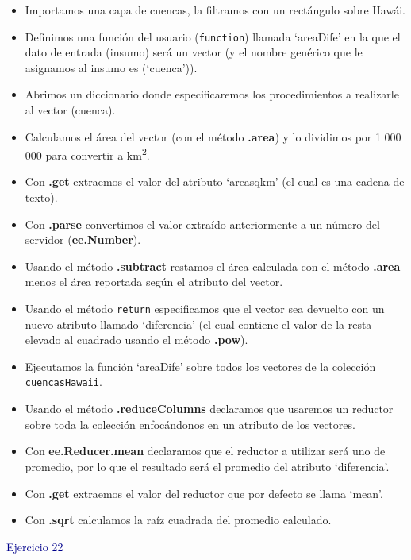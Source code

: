 \documentclass[
  12pt,
  letterpaper,
  twoside]{book}
\providecommand{\tightlist}{%
  \setlength{\itemsep}{0pt}\setlength{\parskip}{0pt}}
\newcommand\boldpurple[1]{\textcolor{darkpurple}{\textbf{#1}}}
\begin{document}
\begin{itemize}
\tightlist
\item
  Importamos una capa de cuencas, la filtramos con un rectángulo sobre Hawái.
\item
  Definimos una función del usuario (\texttt{function}) llamada `areaDife' en la que el dato de entrada (insumo) será un vector (y el nombre genérico que le asignamos al insumo es (`cuenca')).
\item
  Abrimos un diccionario donde especificaremos los procedimientos a realizarle al vector (cuenca).
\item
  Calculamos el área del vector (con el método \boldpurple{.area}) y lo dividimos por 1 000 000 para convertir a km\textsuperscript{2}.
\item
  Con \boldpurple{.get} extraemos el valor del atributo `areasqkm' (el cual es una cadena de texto).
\item
  Con \boldpurple{.parse} convertimos el valor extraído anteriormente a un número del servidor (\boldpurple{ee.Number}).
\item
  Usando el método \boldpurple{.subtract} restamos el área calculada con el método \boldpurple{.area} menos el área reportada según el atributo del vector.
\item
  Usando el método \texttt{return} especificamos que el vector sea devuelto con un nuevo atributo llamado `diferencia' (el cual contiene el valor de la resta elevado al cuadrado usando el método \boldpurple{.pow}).
\item
  Ejecutamos la función `areaDife' sobre todos los vectores de la colección \texttt{cuencasHawaii}.
\item
  Usando el método \boldpurple{.reduceColumns} declaramos que usaremos un reductor sobre toda la colección enfocándonos en un atributo de los vectores.
\item
  Con \boldpurple{ee.Reducer.mean} declaramos que el reductor a utilizar será uno de promedio, por lo que el resultado será el promedio del atributo `diferencia'.
\item
  Con \boldpurple{.get} extraemos el valor del reductor que por defecto se llama `mean'.
\item
  Con \boldpurple{.sqrt} calculamos la raíz cuadrada del promedio calculado.
\end{itemize}

\newpage

\textcolor{darkblue}{Ejercicio 22}

\end{document}
